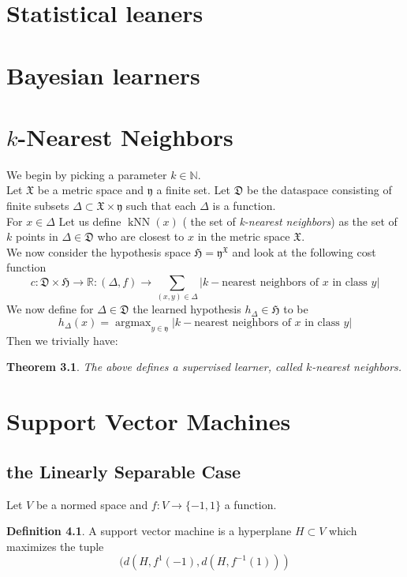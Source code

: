 \documentclass{book}
\theoremstyle{plain}
\newtheorem{theorem}[corollary]{Theorem}
\theoremstyle{definition}
\newtheorem{definition}[corollary]{Definition}
\DeclareMathOperator{\argmax}{argmax}
\renewcommand{\d}[1]{\mathbb{#1}}
\newcommand{\f}[1]{\mathfrak{#1}}
\DeclareMathOperator{\kNN}{kNN}
\newcommand{\mor}{\longrightarrow}
\begin{document}
\chapter{Statistical leaners}
\chapter{Bayesian learners}
\chapter{$k$-Nearest Neighbors}
We begin by picking a parameter $k \in \d{N}$.\\
Let $\f{X}$ be a metric space and $\f{y}$ a finite set.  Let $\f{D}$ be the dataspace consisting of finite subsets $\Delta \subset \f{X}\times \f{y}$ such that each $\Delta$ is a function.  \\
For $x \in \Delta$ Let us define  $\kNN(x)$ ( the set of \emph{k-nearest neighbors}) as the set of $k$ points in $\Delta\in \f{D}$ who are closest to $x$ in the metric space $\f{X}$.\\
We now consider the hypothesis space $\f{H} = \f{y}^\f{X}$ and look at the following cost function 
\[
c: \f{D}\times \f{H}\mor \d{R}: (\Delta,f)\mor  \sum_{(x,y) \in \Delta} \vert k-\textrm{nearest neighbors of }x \textrm{ in class } y\vert 
\]
We now define for $\Delta \in \f{D}$ the learned hypothesis $h_\Delta \in \f{H}$ to be
\[
h_\Delta(x) = \argmax_{y \in \f{y}}  \vert k-\textrm{nearest neighbors of }x \textrm{ in class } y\vert \]
Then we trivially have:

\begin{theorem}
The above defines a supervised learner, called $k$-nearest neighbors.
\end{theorem}
\chapter{Support Vector Machines}

\section{the Linearly Separable Case}


Let $V$ be a normed space and $f:V \mor \{-1,1\}$ a function. 
\begin{definition}
A support vector machine is a hyperplane $H \subset V$ which maximizes the tuple
\[
(d(H,f^{1}(-1),d(H,f^{-1}(1)))
\]	
\end{definition}
\end{document}
